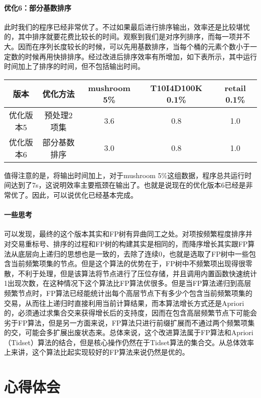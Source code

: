 \documentclass[a4paper,9pt]{article}
\begin{document}
\paragraph{优化6：部分基数排序} 此时我们的程序已经非常优了。不过如果最后进行排序输出，效率还是比较堪忧的，其中排序就要花费比较长的时间。观察到我们是对序列排序，而每一项并不大。因而在序列长度较长的时候，可以先用基数排序，当每个桶的元素个数小于一定数的时候再用快排排序。经过改进后排序效率有所增加，如下表所示，其中运行时间加上了排序的时间，但不包括输出时间。
\begin{center}
	\begin{tabular}{ccccc}
		版本&优化方法&mushroom 5\%&T10I4D100K 0.1\%&retail 0.1\%\\\hline
		优化版本5&预处理2项集&3.6&0.8&1.0\\
		优化版本6&部分基数排序&3.0&0.8&1.0
	\end{tabular}
\end{center}
值得注意的是，将输出时间加上，对于mushroom 5\%这组数据，程序总共运行时间达到了7s，这说明效率主要瓶颈在输出了。也就是说现在的优化版本6已经是非常优了。因此，可以说优化已经基本完成。

\paragraph{一些思考} 可以发现，最终的这个版本其实和FP树有异曲同工之处。对项按频繁程度排序并对交易重标号、排序的过程和FP树的构建其实是相同的，而降序增长其实跟FP算法从底层向上递归的思想也是一致的，去除了连续0，也就是选取了FP树中一些包含当前频繁项集的节点。但是这个算法的优势在于，FP树中不频繁项出现得很零散，不利于处理，但是该算法将节点进行了压位存储，并且调用内置函数快速统计1出现次数，在这种情况下这个算法比FP算法优很多。但是当FP算法递归到高层频繁节点时，FP算法已经能统计出每个高层节点下有多少个包含当前频繁项集的交易，从而往上递归时直接利用当前计算结果，而本算法增长方式还是Apriori的，必须通过求集合交来获得增长后的支持度，因而在包含高层频繁节点下可能会劣于FP算法，但是另一方面来说，FP算法只进行前缀扩展而不通过两个频繁项集的交，可能会多扩展出废状态来。总体来说，这个改进算法属于FP算法和Apriori（Tidset）算法的结合，但是核心操作仍然在于Tidset算法的集合交。从总体效率上来讲，这个算法比起实现较好的FP算法来说仍然是优的。

\section{心得体会}
\end{document}
